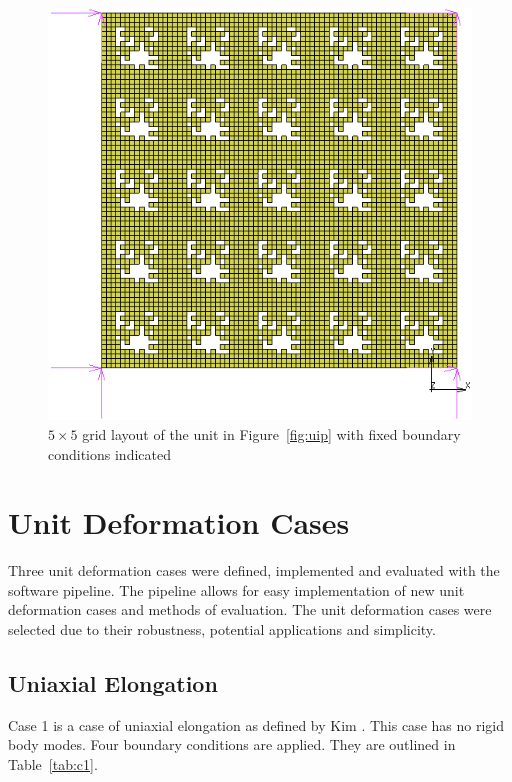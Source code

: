 \begin{figure}[H]
	\centering
	\includegraphics[width=\textwidth]{5x5Layout.png}
	\caption[$5\times 5$ grid layout with fixed boundary conditions indicated]{$5\times 5$ grid layout of the unit in Figure~\ref{fig:uip} with fixed boundary conditions indicated}
	\label{fig:5x5grid}
\end{figure}

\section{Unit Deformation Cases}
\label{sec:UC}

Three unit deformation cases were defined, implemented and evaluated with the software pipeline. The pipeline allows for easy implementation of new unit deformation cases and methods of evaluation. The unit deformation cases were selected due to their robustness, potential applications and simplicity.

\subsection{Uniaxial Elongation}

Case 1 is a case of uniaxial elongation as defined by Kim \citep{Kim2015}. This case has no rigid body modes. Four boundary conditions are applied. They are outlined in Table~\ref{tab:c1}.

